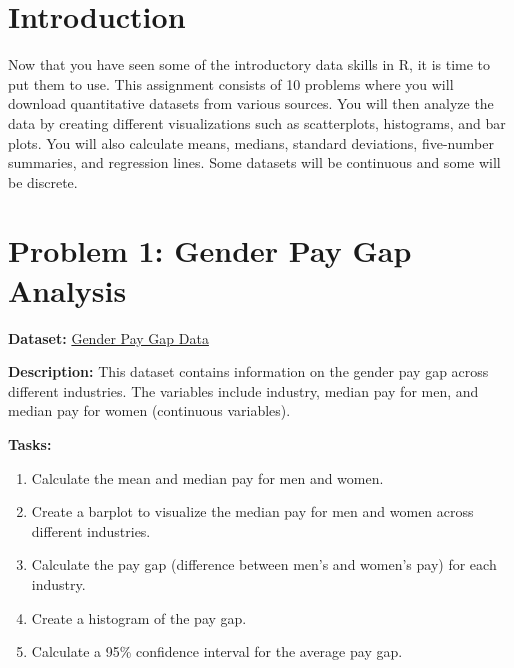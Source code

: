 \documentclass[
  letterpaper,
  DIV=11,
  numbers=noendperiod]{scrreprt}
\providecommand{\tightlist}{%
  \setlength{\itemsep}{0pt}\setlength{\parskip}{0pt}}\usepackage{longtable,booktabs,array}
\begin{document}

\section*{Introduction}\label{introduction}


Now that you have seen some of the introductory data skills in R, it is
time to put them to use. This assignment consists of 10 problems where
you will download quantitative datasets from various sources. You will
then analyze the data by creating different visualizations such as
scatterplots, histograms, and bar plots. You will also calculate means,
medians, standard deviations, five-number summaries, and regression
lines. Some datasets will be continuous and some will be discrete.

\section*{Problem 1: Gender Pay Gap
Analysis}\label{problem-1-gender-pay-gap-analysis}


\textbf{Dataset:} \href{https://data.world/gender-pay-gap}{Gender Pay
Gap Data}

\textbf{Description:} This dataset contains information on the gender
pay gap across different industries. The variables include industry,
median pay for men, and median pay for women (continuous variables).

\textbf{Tasks:}

\begin{enumerate}
\def\labelenumi{\arabic{enumi}.}
\tightlist
\item
  Calculate the mean and median pay for men and women.
\item
  Create a barplot to visualize the median pay for men and women across
  different industries.
\item
  Calculate the pay gap (difference between men's and women's pay) for
  each industry.
\item
  Create a histogram of the pay gap.
\item
  Calculate a 95\% confidence interval for the average pay gap.
\end{enumerate}
\end{document}

